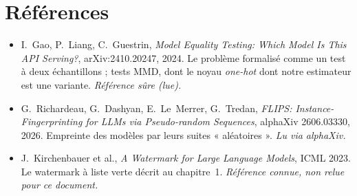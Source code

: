 \documentclass[11pt,a4paper]{report}
\theoremstyle{definition}
\theoremstyle{plain}
\begin{document}
\chapter*{Références}
\begin{itemize}
  \item I.~Gao, P.~Liang, C.~Guestrin, \emph{Model Equality Testing: Which Model Is This API Serving?}, arXiv:2410.20247, 2024. Le problème formalisé comme un test à deux échantillons ; tests MMD, dont le noyau \emph{one-hot} dont notre estimateur est une variante. \emph{Référence sûre (lue).}
  \item G.~Richardeau, G.~Dashyan, E.~Le~Merrer, G.~Tredan, \emph{FLIPS: Instance-Fingerprinting for LLMs via Pseudo-random Sequences}, alphaXiv 2606.03330, 2026. Empreinte des modèles par leurs suites « aléatoires ». \emph{Lu via alphaXiv.}
  \item J.~Kirchenbauer et al., \emph{A Watermark for Large Language Models}, ICML 2023. Le watermark à liste verte décrit au chapitre~1. \emph{Référence connue, non relue pour ce document.}
\end{itemize}
\end{document}
